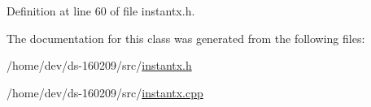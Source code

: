 Definition at line 60 of file instantx.\+h.



The documentation for this class was generated from the following files\+:\begin{DoxyCompactItemize}
\item 
/home/dev/ds-\/160209/src/\hyperlink{instantx_8h}{instantx.\+h}\item 
/home/dev/ds-\/160209/src/\hyperlink{instantx_8cpp}{instantx.\+cpp}\end{DoxyCompactItemize}
